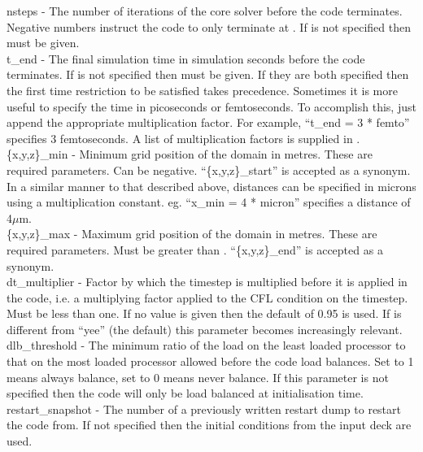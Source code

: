 {\emphtext nsteps} - The number of iterations of the core solver before the
code terminates. Negative numbers instruct the code to only terminate at
. If  is not specified then
 must be given.\\

{\emphtext t\_end} - The final simulation time in simulation seconds before the
code terminates. If  is not specified then
 must be given. If they are both specified then
the first time restriction to be satisfied takes precedence. Sometimes it is
more useful to specify the time in picoseconds or femtoseconds. To accomplish
this, just append the appropriate multiplication factor. For example,
``t\_end = 3 * femto'' specifies 3 femtoseconds. A list of multiplication
factors is supplied in .\\

{\emphtext \{x,y,z\}\_min} - Minimum grid position of the domain in
metres. These are required parameters. Can be negative. ``\{x,y,z\}\_start''
is accepted as a synonym. In a similar manner to that described above,
distances can be specified in microns using a multiplication constant.
eg. ``x\_min = 4 * micron'' specifies a distance of 4$\mu$m.\\

{\emphtext \{x,y,z\}\_max} - Maximum grid position of the domain in
metres. These are required parameters. Must be greater than
.  ``\{x,y,z\}\_end'' is accepted as a synonym.\\

{\emphtext dt\_multiplier} - Factor by which the timestep is multiplied before
it is applied in the code, i.e. a multiplying factor applied to the CFL
condition on the timestep. Must be less than one. If no value is given then
the default of 0.95 is used. If  is different from
``yee'' (the default) this parameter becomes increasingly relevant.\\

{\emphtext dlb\_threshold} - The minimum ratio of the
load on the least loaded processor to that on the most loaded processor allowed
before the code load balances. Set to 1 means
always balance, set to 0 means never balance. If this parameter is not
specified then the code will only be load balanced at initialisation time.\\

{\emphtext restart\_snapshot} - The number of a previously written restart
dump to restart the code from. If not specified then the initial conditions
from the input deck are used.

